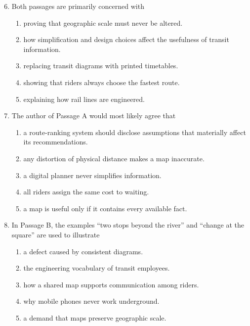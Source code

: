 \begin{enumerate}
\setcounter{enumi}{5}
\item Both passages are primarily concerned with
  \begin{enumerate}
  \item proving that geographic scale must never be altered.
  \item how simplification and design choices affect the usefulness of transit
        information.
  \item replacing transit diagrams with printed timetables.
  \item showing that riders always choose the fastest route.
  \item explaining how rail lines are engineered.
  \end{enumerate}

\item The author of Passage A would most likely agree that
  \begin{enumerate}
  \item a route-ranking system should disclose assumptions that materially affect
        its recommendations.
  \item any distortion of physical distance makes a map inaccurate.
  \item a digital planner never simplifies information.
  \item all riders assign the same cost to waiting.
  \item a map is useful only if it contains every available fact.
  \end{enumerate}

\item In Passage B, the examples ``two stops beyond the river'' and ``change at
the square'' are used to illustrate
  \begin{enumerate}
  \item a defect caused by consistent diagrams.
  \item the engineering vocabulary of transit employees.
  \item how a shared map supports communication among riders.
  \item why mobile phones never work underground.
  \item a demand that maps preserve geographic scale.
  \end{enumerate}


\end{enumerate}
